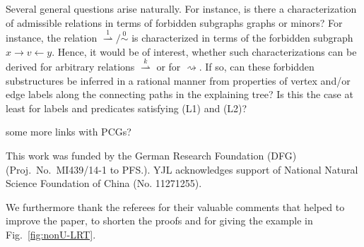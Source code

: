 \documentclass[smallextended]{svjour3}
\newcommand{\TODO}[1]{\begingroup\color{red}#1\endgroup}
\newcommand{\Ro}{\mathrel{\overset{0}{\sim}}}
\newcommand{\Rld}{\mathrel{\overset{1}{\rightharpoonup}}}
\newcommand{\Rldk}{\mathrel{\overset{k}{\rightharpoonup}}}
\newcommand{\Rd}{\mathrel{\rightsquigarrow}}
\begin{document}
Several general questions arise naturally. For instance, is there a
characterization of admissible relations in terms of forbidden subgraphs
graphs or minors? For instance, the relation $\Rld/\Ro$ is characterized in
terms of the forbidden subgraph $x\rightarrow v \leftarrow y$. Hence, it
would be of interest, whether such characterizations can be derived for
arbitrary relations $\Rldk$ or for $\Rd$.  If so, can these forbidden
substructures be inferred in a rational manner from properties of vertex
and/or edge labels along the connecting paths in the explaining tree?
Is this the case at least for labels and predicates satisfying (L1)
  and (L2)?

\TODO{some more links with PCGs?} 


\begin{acknowledgements}
  This work was funded by the German Research Foundation (DFG) (Proj.\ No.\
  MI439/14-1 to PFS.).  YJL acknowledges support of National Natural
  Science Foundation of China (No. 11271255).

	\TODO{We furthermore thank the referees for their valuable comments 
	that helped to improve the paper, to shorten the proofs and for giving the
	example in Fig.\ \ref{fig:nonU-LRT}. }
\end{acknowledgements}

%
%
%

\end{document}
